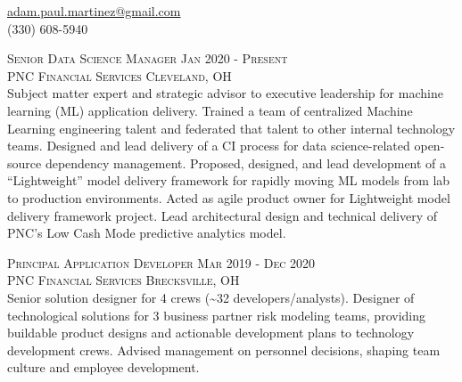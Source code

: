 \documentclass[letterpaper, 11pt]{article} %
\begin{document}
\pagestyle{empty} %



\vspace{-0.5em}

\begin{center}
\href{mailto:adam.paul.martinez@gmail.com}{adam.paul.martinez@gmail.com} \\
(330) 608-5940
\end{center}

\vspace{0.5em}

\justify

\textsc{Senior Data Science Manager \hfill Jan 2020 - Present} \\
\textsc{PNC Financial Services \hfill Cleveland, OH} \\
Subject matter expert and strategic advisor to executive leadership for machine learning (ML) application delivery.
Trained a team of centralized Machine Learning engineering talent and federated that talent to other internal technology teams.
Designed and lead delivery of a CI process for data science-related open-source dependency management.
Proposed, designed, and lead development of a ``Lightweight'' model delivery framework for rapidly moving ML models from lab to production environments.
Acted as agile product owner for Lightweight model delivery framework project.
Lead architectural design and technical delivery of PNC's Low Cash Mode predictive analytics model.

\textsc{Principal Application Developer \hfill Mar 2019 - Dec 2020} \\
\textsc{PNC Financial Services \hfill Brecksville, OH} \\
Senior solution designer for 4 crews (\textasciitilde 32 developers/analysts).
Designer of technological solutions for 3 business partner risk modeling teams, providing buildable product designs and actionable development plans to technology development crews.
Advised management on personnel decisions, shaping team culture and employee development.
\end{document}
